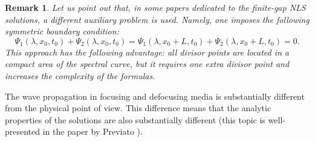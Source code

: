 \documentclass[12pt]{article}
\newtheorem{remark}{Remark}
\begin{document}
\begin{remark}
Let us point out that, in some papers dedicated to the finite-gap NLS solutions, 
a different auxiliary problem is used. Namely, one imposes the following symmetric boundary condition:
\begin{equation}
\label{eq:dir3}
\Psi_1(\lambda,x_0,t_0)+\Psi_2(\lambda,x_0,t_0) = \Psi_1(\lambda,x_0+L,t_0)+\Psi_2(\lambda,x_0+L,t_0)=0.
\end{equation}
This approach has the following advantage: all divisor points are located in a compact area of the spectral curve,  
but it requires one extra divisor point and increases the complexity of the formulas.
\end{remark}
 
The wave propagation in focusing and defocusing media is substantially different from the physical point of view. This difference means that the analytic properties of the solutions are also substantially different (this topic is well-presented in the paper by Previato \cite{Prev}).
\end{document}
